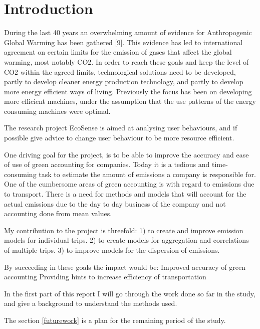 \section{Introduction}
During the last 40 years an overwhelming amount of evidence for Anthropogenic Global Warming has been gathered [9]. This evidence has led to international agreement on certain limits for the emission of gases that affect the global warming, most notably CO2. In order to reach these goals and keep the level of CO2 within the agreed limits, technological solutions need to be developed, partly to develop cleaner energy production technology, and partly to develop more energy efficient ways of living. Previously the focus has been on developing more efficient machines, under the assumption that the use patterns of the energy consuming machines were optimal.

The research project EcoSense is aimed at analysing user behaviours, and if possible give advice to change user behaviour to be more resource efficient.

One driving goal for the project, is to be able to improve the accuracy and ease of use of green accounting for companies. Today it is a tedious and time-consuming task to estimate the amount of emissions a company is responsible for. One of the cumbersome areas of green accounting is with regard to emissions due to transport. There is a need for methods and models that will account for the actual emissions due to the day to day business of the company and not accounting done from mean values.

My contribution to the project is threefold:
	1) to create and improve emission models for individual trips.
	2) to create models for aggregation and correlations of multiple trips.
	3) to improve models for the dispersion of emissions.

By succeeding in these goals the impact would be:
	Improved accuracy of green accounting
	Providing hints to increase efficiency of transportation
	
In the first part of this report I will go through the work done so far in the study, and give a background to understand the methods used.

The section \ref{futurework} is a plan for the remaining period of the study.

